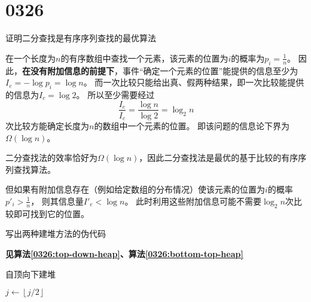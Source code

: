 \section{0326}\label{sec:0326}
\begin{questions}

    \question 证明二分查找是有序序列查找的最优算法
    \begin{solution}
        在一个长度为$n$的有序数组中查找一个元素，该元素的位置为$i$的概率为$p_i = \frac{1}{n}$。
        因此，\textbf{在没有附加信息的前提下}，事件“确定一个元素的位置”能提供的信息至少为$I_e = -\log{p_i} = \log n$。
        而一次比较只能给出真、假两种结果，即一次比较能提供的信息为$I_c = \log{2}$。
        所以至少需要经过
        \[\frac{I_e}{I_c} = \frac{ \log{n} }{ \log{2} } = \log_2{n}\]
        次比较方能确定长度为$n$的数组中一个元素的位置。
        即该问题的信息论下界为$\Omega(\log n)$。

        二分查找法的效率恰好为$\Omega(\log n)$，因此二分查找法是最优的基于比较的有序序列查找算法。

        但如果有附加信息存在（例如给定数组的分布情况）使该元素的位置为$i$的概率$p'_i > \frac{1}{n}$，
        则其信息量$I'_e < \log n$。
        此时利用这些附加信息可能不需要$\log_2{n}$次比较即可找到它的位置。

    \end{solution}


    \question 写出两种建堆方法的伪代码
    \begin{solution}
        \textbf{见算法\ref{0326:top-down-heap}、算法\ref{0326:bottom-top-heap}}
    \end{solution}

    \begin{algorithm}[!htp]
        \caption{自顶向下建堆}\label{0326:top-down-heap}
        \begin{algorithmic}[1]
            \State {}
            \State $j \gets \left\lfloor j/2 \right\rfloor$
            \EndWhile
            \EndFor
        \end{algorithmic}
    \end{algorithm}


\end{questions}
